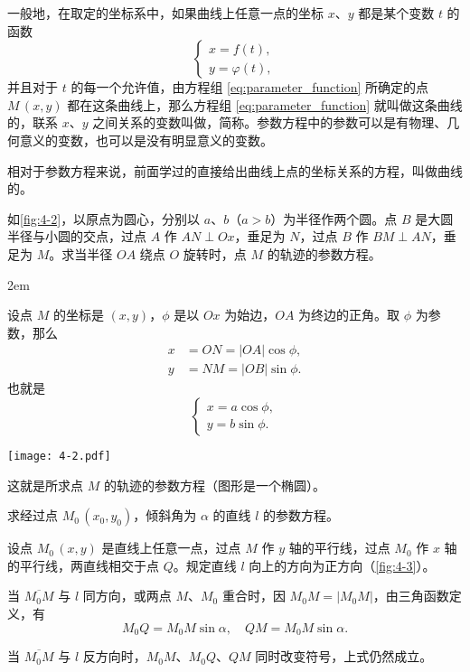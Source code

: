 一般地，在取定的坐标系中，如果曲线上任意一点的坐标 $x$、$y$ 都是某个变数 $t$ 的函数
\begin{equation}
  \label{eq:parameter_function}
  \begin{cases}
    x=f(t),\\
    y=\varphi(t),
  \end{cases}
\end{equation}
并且对于 $t$ 的每一个允许值，由方程组 \eqref{eq:parameter_function} 所确定的点 $M\,(x,y)$ 都在这条曲线上，那么方程组 \eqref{eq:parameter_function} 就叫做这条曲线的，联系 $x$、$y$ 之间关系的变数叫做，简称。参数方程中的参数可以是有物理、几何意义的变数，也可以是没有明显意义的变数。

相对于参数方程来说，前面学过的直接给出曲线上点的坐标关系的方程，叫做曲线的。
\begin{example}
  如\cref{fig:4-2}，以原点为圆心，分别以 $a$、$b$（$a>b$）为半径作两个圆。点 $B$ 是大圆半径与小圆的交点，过点 $A$ 作 $AN\perp Ox$，垂足为 $N$，过点 $B$ 作 $BM \perp AN$，垂足为 $M$。求当半径 $OA$ 绕点 $O$ 旋转时，点 $M$ 的轨迹的参数方程。
\end{example}

\noindent
\begin{minipage}{0.6\linewidth}\parindent2em
\begin{solution}
  设点 $M$ 的坐标是 $(x,y)$，$\phi$ 是以 $Ox$ 为始边，$OA$ 为终边的正角。取 $\phi$ 为参数，那么
  \begin{align*}
    x&=ON=|OA|\cos\phi,\\
    y&=NM=|OB|\sin\phi.
  \end{align*}
  也就是
  \[\begin{cases}x=a\cos\phi,\\y=b\sin\phi.\end{cases}\]
\end{solution}
\end{minipage}\hfill
\begin{minipage}{0.35\linewidth}\centering
  \begin{figurehere}
    \texttt{[image: 4-2.pdf]}
    \caption{}\label{fig:4-2}
  \end{figurehere}
\end{minipage}

\medskip\noindent
这就是所求点 $M$ 的轨迹的参数方程（图形是一个椭圆）。

\begin{example}
  求经过点 $M_0\,(x_0,y_0)$，倾斜角为 $\alpha$ 的直线 $l$ 的参数方程。
\end{example}
\begin{solution}
  设点 $M_0\,(x,y)$ 是直线上任意一点，过点 $M$ 作 $y$ 轴的平行线，过点 $M_0$ 作 $x$ 轴的平行线，两直线相交于点 $Q$。规定直线 $l$ 向上的方向为正方向（\cref{fig:4-3}）。

当 $\overline{M_0M}$ 与 $l$ 同方向，或两点 $M$、$M_0$ 重合时，因 $M_0M=|M_0M|$，由三角函数定义，有
\[M_0Q=M_0M\sin\alpha,\quad QM=M_0M\sin\alpha.\]

当 $\overline{M_0M}$ 与 $l$ 反方向时，$M_0M$、$M_0Q$、$QM$ 同时改变符号，上式仍然成立。
\end{solution}

